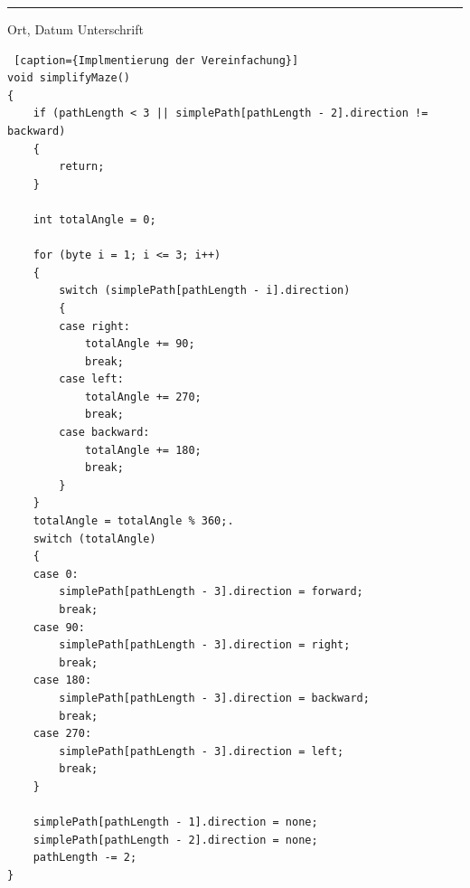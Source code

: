 \documentclass[12pt]{article}
\begin{document}
\vspace{4cm}
\rule{\textwidth}{1pt}
\hspace{2cm} Ort, Datum \hfill Unterschrift \hspace{2cm}

\newpage



\newpage
\begin{lstlisting} [caption={Implmentierung der Vereinfachung}]
void simplifyMaze()
{
    if (pathLength < 3 || simplePath[pathLength - 2].direction != backward)
    {
        return;
    }

    int totalAngle = 0;

    for (byte i = 1; i <= 3; i++)
    {
        switch (simplePath[pathLength - i].direction)
        {
        case right:
            totalAngle += 90;
            break;
        case left:
            totalAngle += 270;
            break;
        case backward:
            totalAngle += 180;
            break;
        }
    }
    totalAngle = totalAngle % 360;.
    switch (totalAngle)
    {
    case 0:
        simplePath[pathLength - 3].direction = forward;
        break;
    case 90:
        simplePath[pathLength - 3].direction = right;
        break;
    case 180:
        simplePath[pathLength - 3].direction = backward;
        break;
    case 270:
        simplePath[pathLength - 3].direction = left;
        break;
    }

    simplePath[pathLength - 1].direction = none;
    simplePath[pathLength - 2].direction = none;
    pathLength -= 2;
}
\end{lstlisting}
\end{document}
